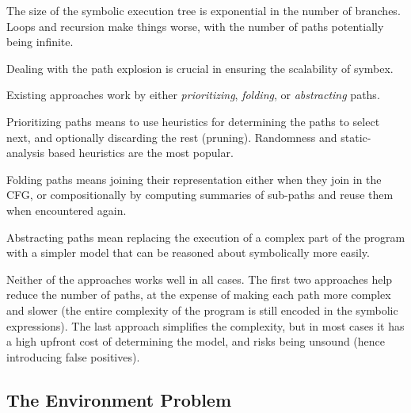 
The size of the symbolic execution tree is exponential in the number of branches. Loops and recursion make things worse, with the number of paths potentially being infinite.

Dealing with the path explosion is crucial in ensuring the scalability of symbex.

Existing approaches work by either \emph{prioritizing}, \emph{folding}, or \emph{abstracting} paths.

Prioritizing paths means to use heuristics for determining the paths to select next, and optionally discarding the rest (pruning).  Randomness and static-analysis based heuristics are the most popular.

Folding paths means joining their representation either when they join in the CFG, or compositionally by computing summaries of sub-paths and reuse them when encountered again.

Abstracting paths mean replacing the execution of a complex part of the program with a simpler model that can be reasoned about symbolically more easily.

Neither of the approaches works well in all cases. The first two approaches help reduce the number of paths, at the expense of making each path more complex and slower (the entire complexity of the program is still encoded in the symbolic expressions).  The last approach simplifies the complexity, but in most cases it has a high upfront cost of determining the model, and risks being unsound (hence introducing false positives).

\subsection{The Environment Problem}

